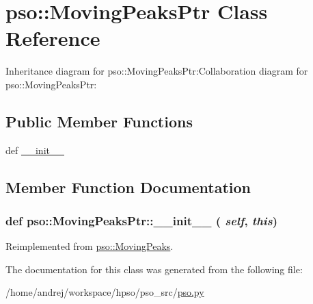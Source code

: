 \hypertarget{classpso_1_1MovingPeaksPtr}{
\section{pso::MovingPeaksPtr Class Reference}
\label{classpso_1_1MovingPeaksPtr}
}
Inheritance diagram for pso::MovingPeaksPtr:Collaboration diagram for pso::MovingPeaksPtr:\subsection*{Public Member Functions}
\begin{CompactItemize}
\item 
def \hyperlink{classpso_1_1MovingPeaksPtr_32e785c6b0bffba8a0baee3920aa31eb}{\_\-\_\-init\_\-\_\-}
\end{CompactItemize}


\subsection{Member Function Documentation}
\hypertarget{classpso_1_1MovingPeaksPtr_32e785c6b0bffba8a0baee3920aa31eb}{
\subsubsection{\setlength{\rightskip}{0pt plus 5cm}def pso::MovingPeaksPtr::\_\-\_\-init\_\-\_\- ( {\em self}, \/   {\em this})}}
\label{classpso_1_1MovingPeaksPtr_32e785c6b0bffba8a0baee3920aa31eb}




Reimplemented from \hyperlink{classpso_1_1MovingPeaks_f48b3a4fe44b6a14626ea7c9dfaccd66}{pso::MovingPeaks}.

The documentation for this class was generated from the following file:\begin{CompactItemize}
\item 
/home/andrej/workspace/hpso/pso\_\-src/\hyperlink{pso_8py}{pso.py}\end{CompactItemize}
